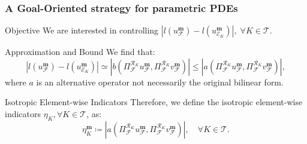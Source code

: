 \begin{frame}
\frametitle{A Goal-Oriented strategy for parametric PDEs}

\begin{block}{Objective}
We are interested in controlling \(\left|l\left(u^{\mathbf{m}}_{\mathcal{F}}\right) - l\left(u^{\mathbf{m}}_{\mathcal{E}_K}\right)\right|, \; \forall K \in \mathcal{T}\).
\end{block}

\begin{block}{Approximation and Bound}
We find that:
\begin{equation}
  \left|l\left(u^{\mathbf{m}}_{\mathcal{F}}\right) - l\left(u^{\mathbf{m}}_{\mathcal{E}_K}\right)\right| \simeq \left|b\left(\Pi_{\mathcal{F}}^{\mathcal{R}_K} u^{\mathbf{m}}_{\mathcal{F}}, \Pi_{\mathcal{F}}^{\mathcal{R}_K} v^{\mathbf{m}}_{\mathcal{F}}\right)\right|
  \leq  \left|a\left(\Pi_{\mathcal{F}}^{\mathcal{R}_K} u^{\mathbf{m}}_{\mathcal{F}}, \Pi_{\mathcal{F}}^{\mathcal{R}_K} v^{\mathbf{m}}_{\mathcal{F}}\right)\right|,
  \label{eq:upper_bound_goa}
\end{equation}
where \(a\) is an alternative operator \textemdash not necessarily the original bilinear form.
\end{block}

\begin{block}{Isotropic Element-wise Indicators}
Therefore, we define the isotropic element-wise indicators \(\eta_K, \forall K \in \mathcal{T}\), as:
\begin{equation}
  \eta^{\mathbf{m}}_K \coloneqq \left|a\left(\Pi_{\mathcal{F}}^{\mathcal{R}_K} u^{\mathbf{m}}_{\mathcal{F}}, \Pi_{\mathcal{F}}^{\mathcal{R}_K} v^{\mathbf{m}}_{\mathcal{F}}\right)\right|, \quad \forall K \in \mathcal{T}.
  \label{eq:error_indicator_goa}
\end{equation}
\end{block}

\end{frame}

